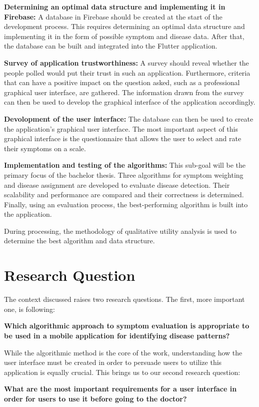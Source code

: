 \begin{description}
	\item \textbf{Determining an optimal data structure and implementing it in Firebase:}
	A database in Firebase should be created at the start of the development process. This requires determining an optimal data structure and implementing it in the form of possible symptom and disease data. After that, the database can be built and integrated into the Flutter application.
	\item \textbf{Survey of application trustworthiness:}
	A survey should reveal whether the people polled would put their trust in such an application. Furthermore, criteria that can have a positive impact on the question asked, such as a professional graphical user interface, are gathered. The information drawn from the survey can then be used to develop the graphical interface of the application accordingly.
	\item \textbf{Devolopment of the user interface:}
	The database can then be used to create the application's graphical user interface. The most important aspect of this graphical interface is the questionnaire that allows the user to select and rate their symptoms on a scale.
	
	\item \textbf{Implementation and testing of the algorithms:}
	This sub-goal will be the primary focus of the bachelor thesis.  Three algorithms for symptom weighting and disease assignment are developed to evaluate disease detection. Their scalability and performance are compared and their correctness is determined. Finally, using an evaluation process, the best-performing algorithm is built into the application.
 
\end{description}
During processing, the methodology of qualitative utility analysis is used to determine the best algorithm and data structure.

\section{Research Question}
The context discussed raises two research questions. The first, more important one, is following:
	\begin{center}
	\textbf{Which algorithmic approach to symptom evaluation is appropriate to be used in a mobile application for identifying disease patterns?}\\
	\end{center}
While the algorithmic method is the core of the work, understanding how the user interface must be created in order to persuade users to utilize this application is equally crucial.
This brings us to our second research question: 
	\begin{center}
	\textbf{What are the most important requirements for a user interface in order for users to use it before going to the doctor?}
	\end{center}


